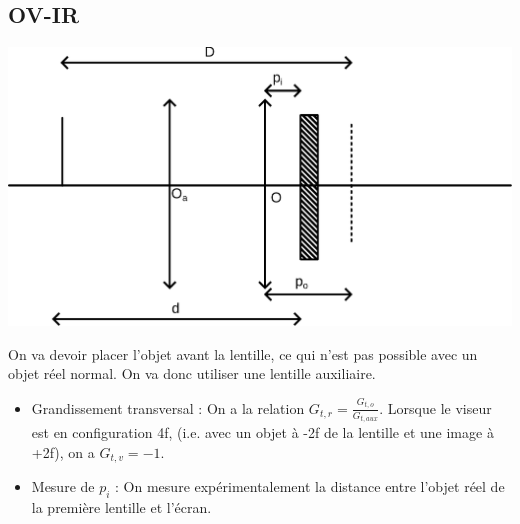 \documentclass[french]{yLectureNote}
\begin{document}
\subsection{OV-IR}
\includegraphics[scale=0.25]{path3}

On va devoir placer l'objet avant la lentille, ce qui n'est pas possible avec un objet réel normal. On va donc utiliser une lentille auxiliaire.


\begin{itemize}
 \item Grandissement transversal : On a la relation \(G_{t, r} = \frac{G_{t, o}}{G_{t, aux}}\). Lorsque le viseur est en configuration 4f, (i.e. avec un objet à -2f de la lentille et une image à +2f), on a \(G_{t, v} = -1\).
 \item Mesure de \(p_i\) : On mesure expérimentalement la distance entre l'objet réel de la première lentille et l'écran.
\end{itemize}
\end{document}
